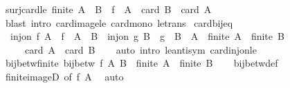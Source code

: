 \begin{isabellebody}
\ surj{\isacharunderscore}{\kern0pt}card{\isacharunderscore}{\kern0pt}le{\isacharcolon}{\kern0pt}\ {\isachardoublequoteopen}finite\ A\ {\isasymLongrightarrow}\ B\ {\isasymsubseteq}\ f\ {\isacharbackquote}{\kern0pt}\ A\ {\isasymLongrightarrow}\ card\ B\ {\isasymle}\ card\ A{\isachardoublequoteclose}\isanewline
%
\isadelimproof
\ \ %
\endisadelimproof
%
\isatagproof
{}\isamarkupfalse%
\ {\isacharparenleft}{\kern0pt}blast\ intro{\isacharcolon}{\kern0pt}\ card{\isacharunderscore}{\kern0pt}image{\isacharunderscore}{\kern0pt}le\ card{\isacharunderscore}{\kern0pt}mono\ le{\isacharunderscore}{\kern0pt}trans{\isacharparenright}{\kern0pt}%
\endisatagproof
{\isafoldproof}%
%
\isadelimproof
\isanewline
%
\endisadelimproof
\isanewline
{}\isamarkupfalse%
\ card{\isacharunderscore}{\kern0pt}bij{\isacharunderscore}{\kern0pt}eq{\isacharcolon}{\kern0pt}\isanewline
\ \ {\isachardoublequoteopen}inj{\isacharunderscore}{\kern0pt}on\ f\ A\ {\isasymLongrightarrow}\ f\ {\isacharbackquote}{\kern0pt}\ A\ {\isasymsubseteq}\ B\ {\isasymLongrightarrow}\ inj{\isacharunderscore}{\kern0pt}on\ g\ B\ {\isasymLongrightarrow}\ g\ {\isacharbackquote}{\kern0pt}\ B\ {\isasymsubseteq}\ A\ {\isasymLongrightarrow}\ finite\ A\ {\isasymLongrightarrow}\ finite\ B\isanewline
\ \ \ \ {\isasymLongrightarrow}\ card\ A\ {\isacharequal}{\kern0pt}\ card\ B{\isachardoublequoteclose}\isanewline
%
\isadelimproof
\ \ %
\endisadelimproof
%
\isatagproof
{}\isamarkupfalse%
\ {\isacharparenleft}{\kern0pt}auto\ intro{\isacharcolon}{\kern0pt}\ le{\isacharunderscore}{\kern0pt}antisym\ card{\isacharunderscore}{\kern0pt}inj{\isacharunderscore}{\kern0pt}on{\isacharunderscore}{\kern0pt}le{\isacharparenright}{\kern0pt}%
\endisatagproof
{\isafoldproof}%
%
\isadelimproof
\isanewline
%
\endisadelimproof
\isanewline
{}\isamarkupfalse%
\ bij{\isacharunderscore}{\kern0pt}betw{\isacharunderscore}{\kern0pt}finite{\isacharcolon}{\kern0pt}\ {\isachardoublequoteopen}bij{\isacharunderscore}{\kern0pt}betw\ f\ A\ B\ {\isasymLongrightarrow}\ finite\ A\ {\isasymlongleftrightarrow}\ finite\ B{\isachardoublequoteclose}\isanewline
%
\isadelimproof
\ \ %
\endisadelimproof
%
\isatagproof
{}\isamarkupfalse%
\ bij{\isacharunderscore}{\kern0pt}betw{\isacharunderscore}{\kern0pt}def\ \isamarkupfalse%
\ finite{\isacharunderscore}{\kern0pt}imageD\ {\isacharbrackleft}{\kern0pt}of\ f\ A{\isacharbrackright}{\kern0pt}\ \isamarkupfalse%
\ auto%
\endisatagproof
{\isafoldproof}%
%
\isadelimproof
\isanewline
%
\endisadelimproof
\isanewline
{}\isamarkupfalse%

\end{isabellebody}
